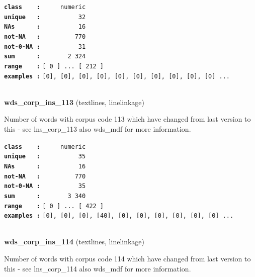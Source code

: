 \documentclass[]{article}
\begin{document}
\textbf{\texttt{class\ \ \ \ :}} \texttt{~~~~~numeric}\\
\textbf{\texttt{unique\ \ \ :}} \texttt{~~~~~~~~~~32}\\
\textbf{\texttt{NAs\ \ \ \ \ \ :}} \texttt{~~~~~~~~~~16}\\
\textbf{\texttt{not-NA\ \ \ :}} \texttt{~~~~~~~~~770}\\
\textbf{\texttt{not-0-NA\ :}} \texttt{~~~~~~~~~~31}\\
\textbf{\texttt{sum\ \ \ \ \ \ :}} \texttt{~~~~~~~2~324}\\
\textbf{\texttt{range\ \ \ \ :}}
\texttt{{[}\ 0\ {]}\ ...\ {[}\ 212\ {]}}\\
\textbf{\texttt{examples\ :}}
\texttt{{[}0{]},\ {[}0{]},\ {[}0{]},\ {[}0{]},\ {[}0{]},\ {[}0{]},\ {[}0{]},\ {[}0{]},\ {[}0{]},\ {[}0{]}\ ...}\\

~

\textbf{wds\_corp\_ins\_113} (textlines, linelinkage)

Number of words with corpus code 113 which have changed from last
version to this - see lns\_corp\_113 also wds\_mdf for more information.

\textbf{\texttt{class\ \ \ \ :}} \texttt{~~~~~numeric}\\
\textbf{\texttt{unique\ \ \ :}} \texttt{~~~~~~~~~~35}\\
\textbf{\texttt{NAs\ \ \ \ \ \ :}} \texttt{~~~~~~~~~~16}\\
\textbf{\texttt{not-NA\ \ \ :}} \texttt{~~~~~~~~~770}\\
\textbf{\texttt{not-0-NA\ :}} \texttt{~~~~~~~~~~35}\\
\textbf{\texttt{sum\ \ \ \ \ \ :}} \texttt{~~~~~~~3~340}\\
\textbf{\texttt{range\ \ \ \ :}}
\texttt{{[}\ 0\ {]}\ ...\ {[}\ 422\ {]}}\\
\textbf{\texttt{examples\ :}}
\texttt{{[}0{]},\ {[}0{]},\ {[}0{]},\ {[}40{]},\ {[}0{]},\ {[}0{]},\ {[}0{]},\ {[}0{]},\ {[}0{]},\ {[}0{]}\ ...}\\

~

\textbf{wds\_corp\_ins\_114} (textlines, linelinkage)

Number of words with corpus code 114 which have changed from last
version to this - see lns\_corp\_114 also wds\_mdf for more information.
\end{document}
